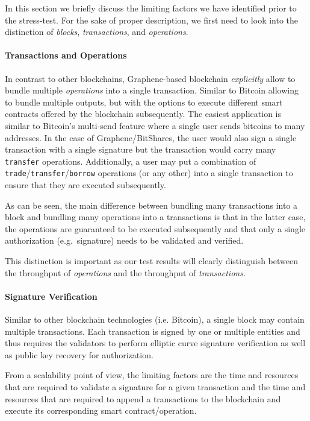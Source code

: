 In this section we briefly discuss the limiting factors we have identified
prior to the stress-test. For the sake of proper description, we first need to
look into the distinction of \emph{blocks}, \emph{transactions}, and
\emph{operations}.

\paragraph{Transactions and Operations}
In contrast to other blockchains, Graphene-based blockchain \emph{explicitly}
allow to bundle multiple \emph{operations} into a single transaction. Similar
to Bitcoin allowing to bundle multiple outputs, but with the options to execute
different smart contracts offered by the blockchain subsequently. The easiest
application is similar to Bitcoin's multi-send feature where a single user
sends bitcoins to many addresses. In the case of Graphene/BitShares, the user
would also sign a single transaction with a single signature but the
transaction would carry many \texttt{transfer} operations. Additionally, a
user may put a combination of \texttt{trade}/\texttt{transfer}/\texttt{borrow}
operations (or any other) into a single transaction to ensure that they are
executed subsequently.

As can be seen, the main difference between bundling many transactions into a
block and bundling many operations into a transactions is that in the latter
case, the operations are guaranteed to be executed subsequently and that only a
single authorization (e.g.\ signature) needs to be validated and verified.

This distinction is important as our test results will clearly distinguish
between the throughput of \emph{operations} and the throughput of
\emph{transactions}.

\paragraph{Signature Verification}
Similar to other blockchain technologies (i.e. Bitcoin), a single block may
contain multiple transactions. Each transaction is signed by one or multiple
entities and thus requires the validators to perform elliptic curve signature
verification as well as public key recovery for authorization.

From a scalability point of view, the limiting factors are the time and
resources that are required to validate a signature for a given transaction and
the time and resources that are required to append a transactions to the
blockchain and execute its corresponding smart contract/operation.

